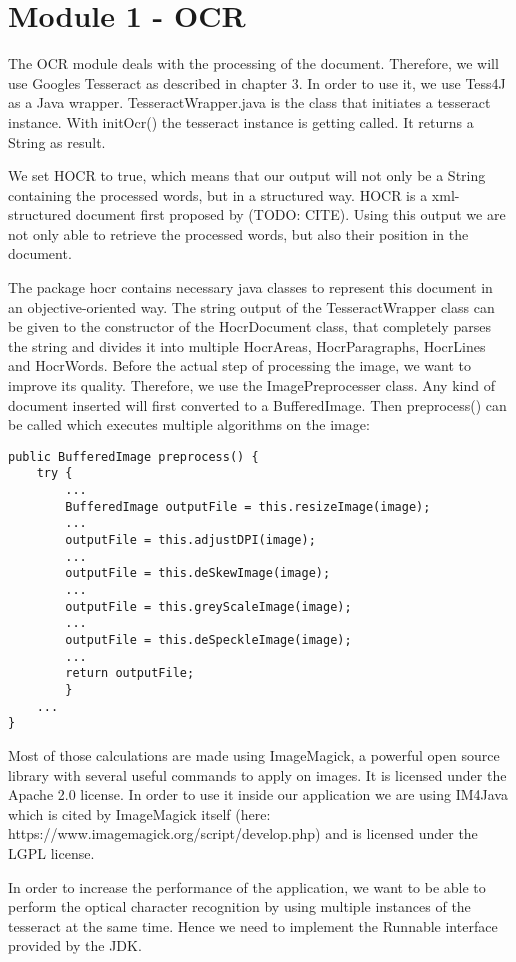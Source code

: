 \section{Module 1 - OCR}

The OCR module deals with the processing of the document. Therefore, we will use Googles Tesseract as described in chapter 3. In order to use it, we use Tess4J as a Java wrapper. TesseractWrapper.java is the class that initiates a tesseract instance. With initOcr() the tesseract instance is getting called. It returns a String as result. 

We set HOCR to true, which means that our output will not only be a String containing the processed words, but in a structured way. HOCR is a xml-structured document first proposed by (TODO: CITE). Using this output we are not only able to retrieve the processed words, but also their position in the document.

The package hocr contains necessary java classes to represent this document in an objective-oriented way. The string output of the TesseractWrapper class can be given to the constructor of the HocrDocument class, that completely parses the string and divides it into multiple HocrAreas, HocrParagraphs, HocrLines and HocrWords.
Before the actual step of processing the image, we want to improve its quality. Therefore, we use the ImagePreprocesser class. Any kind of document inserted will first converted to a BufferedImage. Then preprocess() can be called which executes multiple algorithms on the image:

\begin{lstlisting}
public BufferedImage preprocess() {
    try {
        ...
        BufferedImage outputFile = this.resizeImage(image);
		...
        outputFile = this.adjustDPI(image);
		...
        outputFile = this.deSkewImage(image);
		...
        outputFile = this.greyScaleImage(image);
		...
        outputFile = this.deSpeckleImage(image);
		...
        return outputFile;
        } 
  	...
}
\end{lstlisting}

Most of those calculations are made using ImageMagick, a powerful open source library with several useful commands to apply on images. It is licensed under the Apache 2.0 license. In order to use it inside our application we are using IM4Java which is cited by ImageMagick itself (here: https://www.imagemagick.org/script/develop.php) and is licensed under the LGPL license.

In order to increase the performance of the application, we want to be able to perform the optical character recognition by using multiple instances of the tesseract at the same time. Hence we need to implement the Runnable interface provided by the JDK. 

